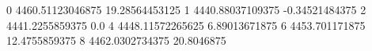 0 4460.51123046875 19.28564453125
1 4440.88037109375 -0.34521484375
2 4441.2255859375 0.0
4 4448.11572265625 6.89013671875
6 4453.701171875 12.4755859375
8 4462.0302734375 20.8046875
